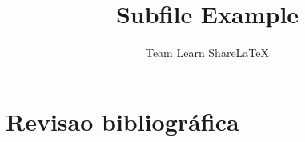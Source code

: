 \documentclass{article}
\title{Subfile Example}
\author{Team Learn ShareLaTeX}
\date{ }
\begin{document}
\maketitle



\section{Revisao bibliográfica}


\end{document}
